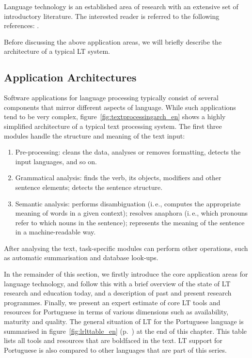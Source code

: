\begin{multicols}{2}
Language technology is an established area of research with an extensive set of introductory literature. The interested reader is referred to the following references:  \cite{carstensen-etal1, jurafsky-martin01, manning-schuetze1, lt-world1, lt-survey1}.

Before discussing the above application areas, we will briefly describe the architecture of a typical LT system.

\subsection{Application Architectures}

Software applications for language processing typically consist of several components that mirror different aspects of language. While such applications tend to be very complex, figure~\ref{fig:textprocessingarch_en} shows a highly simplified architecture of a typical text processing system. The first three modules handle the structure and meaning of the text input:

\begin{enumerate}
\item Pre-processing: cleans the data, analyses or removes formatting, detects the input languages, and so on.
\item Grammatical analysis: finds the verb, its objects, modifiers and other sentence elements; detects the sentence structure.
\item Semantic analysis: performs disambiguation (i.\,e., computes the appropriate meaning of words in a given context); resolves anaphora (i.\,e., which pronouns refer to which nouns in the sentence); represents the meaning of the sentence in a machine-readable way.
\end{enumerate}

After analysing the text, task-specific modules can perform other operations, such as automatic summarisation and database look-ups.

In the remainder of this section, we firstly introduce the core application areas for language technology, and follow this with a brief overview of the state of LT research and education today, and a description of past and present research programmes. Finally, we present an expert estimate of core LT tools and resources for Portuguese in terms of various dimensions such as availability, maturity and quality. The general situation of LT for the Portuguese language is summarised in figure~\ref{fig:lrlttable_en} (p.~\pageref{fig:lrlttable_en}) at the end of this chapter. This table lists all tools and resources that are boldfaced in the text. LT support for Portuguese is also compared to other languages that are part of this series.


\end{multicols}
